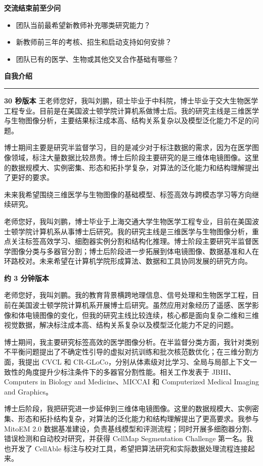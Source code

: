 \documentclass[11pt,a4paper]{ctexart}
\newcommand{\sectionbar}[1]{%
  \vspace{0.35em}
  {\large\bfseries\sffamily\color{accent} #1}\par
  \vspace{-0.35em}\color{accent}\rule{\textwidth}{0.7pt}\color{black}\vspace{0.2em}
}
\newcommand{\prompt}[1]{\textbf{\color{accent}#1}}
\begin{document}
\prompt{交流结束前至少问}
\begin{itemize}
  \item 团队当前最希望新教师补充哪类研究能力？
  \item 新教师前三年的考核、招生和启动支持如何安排？
  \item 团队已有的医学、生物或其他交叉合作基础有哪些？
\end{itemize}

\newpage
\sectionbar{自我介绍}

\prompt{30 秒版本}
王老师您好，我叫刘鹏，硕士毕业于中科院，博士毕业于交大生物医学工程专业。目前是在美国波士顿学院计算机系做博士后。我的研究主线是三维医学与生物图像分析，主要结果标注成本高、结构关系复杂以及模型泛化能力不足的问题。

博士期间主要是研究半监督学习，目的是减少对于标注数据的需求，因为在医学图像领域，标注大量数据比较昂贵。博士后阶段主要研究的是三维体电镜图像。这里的数据规模大、实例密集、形态和拓扑学复杂，对算法的泛化能力和结构理解提出了更好的要求。

未来我希望围绕三维医学与生物图像的基础模型、标签高效与跨模态学习等方向继续研究。

老师您好，我叫刘鹏，博士毕业于上海交通大学生物医学工程专业，目前在美国波士顿学院计算机系从事博士后研究。我的研究主线是三维医学与生物图像分析，重点关注标签高效学习、细胞器实例分割和结构化推理。博士阶段主要研究半监督医学图像分类与多器官分割；博士后阶段进一步拓展到体电镜图像、数据基准和人在环路校对。未来希望在计算机学院形成算法、数据和工具协同发展的研究方向。

\prompt{约 3 分钟版本}

老师您好，我叫刘鹏。我的教育背景横跨地理信息、信号处理和生物医学工程，目前在美国波士顿学院计算机系开展博士后研究。虽然应用对象经历了遥感、医学影像和体电镜图像的变化，但我的研究主线比较连续，核心都是面向复杂二维和三维视觉数据，解决标注成本高、结构关系复杂以及模型泛化能力不足的问题。

博士期间，我主要研究标签高效的医学图像分析。在半监督分类方面，我针对类别不平衡问题提出了不确定性引导的虚拟对抗训练和批次核范数优化；在三维分割方面，我提出 CVCL 和 CR-GLoCo，分别从体素级对比学习、全局与局部上下文一致性的角度提升少标注条件下的多器官分割性能。相关工作发表于 JBHI、Computers in Biology and Medicine、MICCAI 和 Computerized Medical Imaging and Graphics。

博士后阶段，我把研究进一步延伸到三维体电镜图像。这里的数据规模大、实例密集、形态和拓扑结构复杂，对算法的泛化能力和结构理解提出了更高要求。我参与 MitoEM 2.0 数据基准建设，负责基线模型和评测流程；同时开展多细胞器分割、错误检测和自动校对研究，并获得 CellMap Segmentation Challenge 第一名。我也开发了 CellAble 标注与校对工具，希望把算法研究和实际数据处理流程连接起来。
\end{document}

